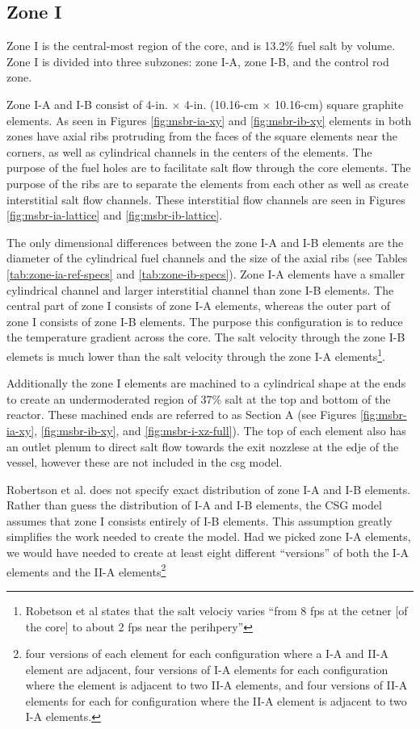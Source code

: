\subsection{Zone I} Zone I is the central-most region of the core, and is 13.2\%
fuel salt by volume. Zone I is divided into three subzones: zone I-A, zone I-B,
and the control rod zone.

Zone I-A and I-B consist of 4-in. $\times$ 4-in. (10.16-cm $\times$ 10.16-cm)
square graphite elements. As seen in Figures \ref{fig:msbr-ia-xy} and
\ref{fig:msbr-ib-xy} elements in both zones have axial ribs protruding from
the faces of the square elements near the corners, as well as cylindrical
channels in the centers of the elements. The purpose of the fuel holes are to
facilitate salt flow through the core elements. The purpose of the ribs are to
separate the elements from each other as well as create interstitial salt flow
channels\cite{robertson_conceptual_1971}. These interstitial flow channels
are seen in Figures \ref{fig:msbr-ia-lattice} and \ref{fig:msbr-ib-lattice}.

The only dimensional differences between the zone I-A and I-B elements are the
diameter of the cylindrical fuel channels and the size of the axial ribs (see
Tables \ref{tab:zone-ia-ref-specs} and \ref{tab:zone-ib-specs}). Zone I-A
elements have a smaller cylindrical channel and larger interstitial channel
than zone I-B elements. The central part of zone I consists of zone I-A
elements, whereas the outer part of zone I consists of zone I-B
elements\cite{robertson_conceptual_1971}. The purpose this configuration is to
reduce the temperature gradient across the core. The salt velocity through the
zone I-B elemets is much lower than the salt velocity through the zone I-A
elements\footnote{Robetson et al states that the salt velociy varies ``from 8
fps at the cetner [of the core] to about 2 fps near the
perihpery''\cite{robertson_conceptual_1971}}.

Additionally the zone I elements are machined to a cylindrical shape at the ends
to create an undermoderated region of 37\% salt at the top and bottom of the
reactor\cite{robertson_conceptual_1971}. These machined ends are referred to as
Section A (see Figures \ref{fig:msbr-ia-xy}, \ref{fig:msbr-ib-xy}, and
\ref{fig:msbr-i-xz-full}). The top of each element also has an outlet plenum to
direct salt flow towards the exit nozzlese at the edje of the vessel, however
these are not included in the \Gls{csg} model.

Robertson et al. does not specify exact distribution of zone I-A and I-B
elements. Rather than guess the distribution of I-A and I-B elements, the CSG
model assumes that zone I consists entirely of I-B elements. This assumption
greatly simplifies the work needed to create the model. Had we picked zone I-A
elements, we would have needed to create at least eight different ``versions''
of both the I-A elements and the II-A elements\footnote{four versions of each
element for each configuration where a I-A and II-A element are adjacent,
four versions of I-A elements for each configuration where the element is
adjacent to two II-A elements, and four versions of II-A elements for each for
configuration where the II-A element is adjacent to two I-A elements.}

